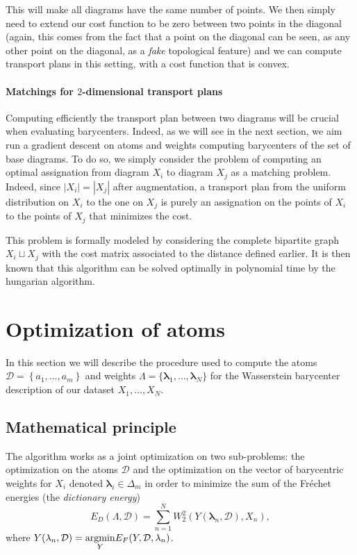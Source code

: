 \documentclass[sigconf,nonacm]{acmart}
\def\abs#1{\left|#1\right|}
\def\llambda{\mathbf{\lambda}}
\def\D{\mathcal{D}}
\begin{document}
This will make all diagrams have the same number of points. We then simply need to
extend our cost function to be zero between two points in the diagonal (again,
this comes from the fact that a point on the diagonal can be seen, as any other
point on the diagonal, as a \emph{fake} topological feature) and we can compute
transport plans in this setting, with a cost function that is convex.

\paragraph{Matchings for \texorpdfstring{$2$-dimensional}{2-dimensional} transport plans}
Computing efficiently the transport plan between two diagrams will be crucial when evaluating barycenters.
Indeed, as we will see in the next section, we aim run a gradient descent on atoms and weights computing
barycenters of the set of base diagrams.
To do so, we simply consider the problem of computing an optimal assignation from diagram $X_{i}$ to
diagram $X_{j}$ as a matching problem.
Indeed, since $\abs{X_{i}} = \abs{X_{j}}$ after augmentation, a transport plan from the uniform
distribution on $X_{i}$ to the one on $X_{j}$ is purely an assignation on the points of $X_{i}$ to the
points of $X_{j}$ that minimizes the cost.

This problem is formally modeled by considering the complete bipartite graph $X_{i} \sqcup X_{j}$ with
the cost matrix associated to the distance defined earlier.
It is then known that this algorithm can be solved optimally in polynomial time by the hungarian algorithm.

\section{Optimization of atoms}
In this section we will describe the procedure used to compute the atoms $\mathcal{D} = \left\{a_{1}, \ldots, a_{m}\right\}$ and
weights $\Lambda = \{\llambda_{1}, \ldots, \llambda_{N}\}$ for the Wasserstein barycenter description of our
dataset $X_{1}, \ldots, X_{N}$.

\subsection{Mathematical principle}
The algorithm works as a joint optimization on two sub-problems: the optimization on the atoms $\D$ and the
optimization on the vector of barycentric weights for $X_{i}$ denoted $\llambda_{i} \in \Delta_{m}$
in order to minimize the sum of the Fréchet energies (the \emph{dictionary energy})
\begin{equation*}
	E_{D}(\Lambda, \D) = \sum_{n = 1}^{N}W_{2}^{2}(Y(\llambda_{n}, \D), X_{n}),
\end{equation*}
where $Y(\llambda_{n}, \D) = \underset{Y}{\rm argmin} E_{F}(Y, \D, \llambda_{n})$.
\end{document}
